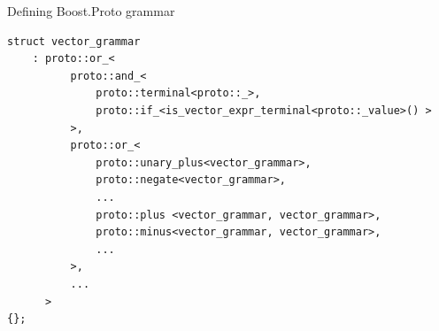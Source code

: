 \documentclass[@BEAMER_OPTIONS@]{beamer}
\begin{document}
\begin{frame}[fragile]{Defining Boost.Proto grammar}
    \begin{exampleblock}{}
        \begin{lstlisting}
struct vector_grammar
    : proto::or_<
          proto::and_<
              proto::terminal<proto::_>,
              proto::if_<is_vector_expr_terminal<proto::_value>() >
          >,
          proto::or_<
              proto::unary_plus<vector_grammar>,
              proto::negate<vector_grammar>,
              ...
              proto::plus <vector_grammar, vector_grammar>,
              proto::minus<vector_grammar, vector_grammar>,
              ...
          >,
          ...
      >
{};
        \end{lstlisting}
    \end{exampleblock}
\end{frame}
\end{document}
